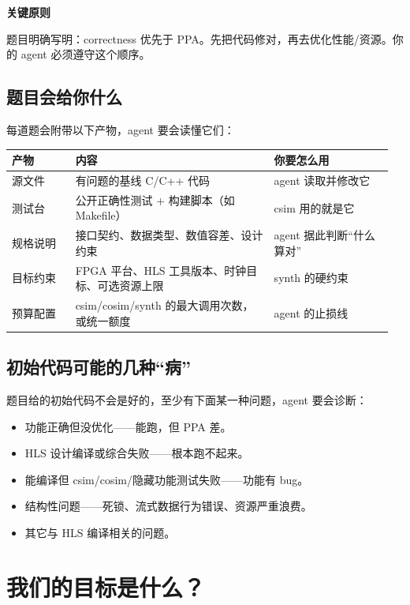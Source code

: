 \documentclass[12pt,a4paper]{ctexbook}
\begin{document}
\begin{notebox}
\textbf{关键原则}\par
题目明确写明：correctness 优先于 PPA。先把代码修对，再去优化性能/资源。你的 agent 必须遵守这个顺序。
\end{notebox}

\section{题目会给你什么}

每道题会附带以下产物，agent 要会读懂它们：

\begin{longtable}{@{}p{0.16\linewidth}p{0.50\linewidth}p{0.30\linewidth}@{}}
\toprule
\textbf{产物} & \textbf{内容} & \textbf{你要怎么用} \\
\midrule
\endhead
源文件 & 有问题的基线 C/C++ 代码 & agent 读取并修改它 \\
测试台 & 公开正确性测试 + 构建脚本（如 Makefile） & csim 用的就是它 \\
规格说明 & 接口契约、数据类型、数值容差、设计约束 & agent 据此判断“什么算对” \\
目标约束 & FPGA 平台、HLS 工具版本、时钟目标、可选资源上限 & synth 的硬约束 \\
预算配置 & csim/cosim/synth 的最大调用次数，或统一额度 & agent 的止损线 \\
\bottomrule
\end{longtable}

\section{初始代码可能的几种“病”}

题目给的初始代码不会是好的，至少有下面某一种问题，agent 要会诊断：

\begin{itemize}
\item 功能正确但没优化——能跑，但 PPA 差。
\item HLS 设计编译或综合失败——根本跑不起来。
\item 能编译但 csim/cosim/隐藏功能测试失败——功能有 bug。
\item 结构性问题——死锁、流式数据行为错误、资源严重浪费。
\item 其它与 HLS 编译相关的问题。
\end{itemize}

\chapter{我们的目标是什么？}
\end{document}
